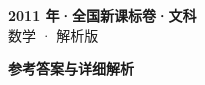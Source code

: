 \documentclass[zihao=-4, a4paper]{ctexart}
\begin{document}
\begin{center}
  {\Large\bfseries 2011 年·全国新课标卷·文科}\\[4pt]
  {\large 数学 · 解析版}
\end{center}
\medskip
{}

\clearpage
{}
\begin{center}{\Large\bfseries 参考答案与详细解析}\end{center}
\medskip

\end{document}
